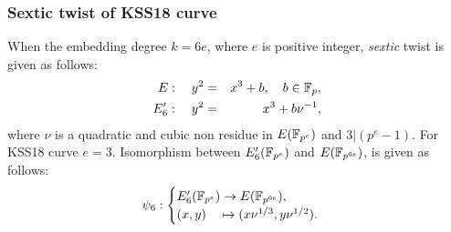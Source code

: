 \subsubsection{Sextic twist of KSS18 curve}

When the embedding degree $k = 6e$, where $e$ is positive integer, \textit{sextic} twist  is given as follows:
\begin{eqnarray}
E:  \quad y^2 & = & x^3+b, \quad b \in {\mathbb{F}}_{p}, \\
E'_6: \quad y^2 & =  & x^3+b\nu^{-1},
\end{eqnarray}  
where $\nu$ is a quadratic and cubic non residue in $E({\mathbb{F}}_{p^{e}})$ and $3|(p^e-1)$.  For KSS18 curve $e=3$. Isomorphism between $E'_6({\mathbb{F}}_{p^{e}})$ and $E({\mathbb{F}}_{p^{6e}})$, is given as follows:
\begin{eqnarray}
\psi_6 : \begin{cases}
E'_6({\mathbb{F}}_{p^{e}}) \rightarrow E({\mathbb{F}}_{p^{6e}}),\\
(x,y) \quad \mapsto (x\nu^{1/3},y\nu^{1/2}).
\end{cases}
\end{eqnarray}


